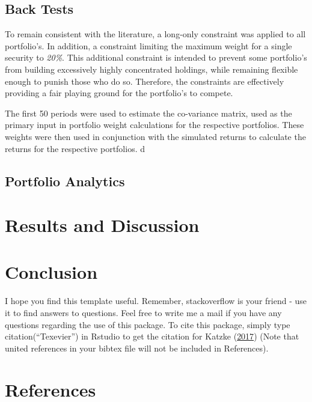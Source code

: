 \documentclass[11pt,preprint, authoryear]{elsarticle}
\numberwithin{equation}{section}
\numberwithin{figure}{section}
\numberwithin{table}{section}
\begin{document}
\hypertarget{back-tests}{%
\subsection{Back Tests}\label{back-tests}}

To remain consistent with the literature, a long-only constraint was
applied to all portfolio's. In addition, a constraint limiting the
maximum weight for a single security to \emph{20\%}. This additional
constraint is intended to prevent some portfolio's from building
excessively highly concentrated holdings, while remaining flexible
enough to punish those who do so. Therefore, the constraints are
effectively providing a fair playing ground for the portfolio's to
compete.

The first 50 periods were used to estimate the co-variance matrix, used
as the primary input in portfolio weight calculations for the respective
portfolios. These weights were then used in conjunction with the
simulated returns to calculate the returns for the respective
portfolios. d

\hypertarget{portfolio-analytics}{%
\subsection{Portfolio Analytics}\label{portfolio-analytics}}

\hypertarget{results-and-discussion}{%
\section{Results and Discussion}\label{results-and-discussion}}

\hypertarget{conclusion}{%
\section{Conclusion}\label{conclusion}}

I hope you find this template useful. Remember, stackoverflow is your
friend - use it to find answers to questions. Feel free to write me a
mail if you have any questions regarding the use of this package. To
cite this package, simply type citation(``Texevier'') in Rstudio to get
the citation for Katzke (\protect\hyperlink{ref-Texevier}{2017}) (Note
that united references in your bibtex file will not be included in
References).

\newpage

\hypertarget{references}{%
\section*{References}\label{references}}
\end{document}
